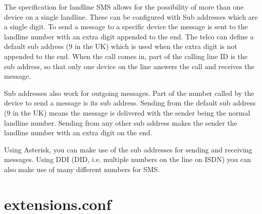    The specification for landline SMS allows for the possibility of more
   than one device on a single landline. These can be configured with Sub
   addresses which are a single digit. To send a message to a specific
   device the message is sent to the landline number with an extra digit
   appended to the end. The telco can define a default sub address (9 in
   the UK) which is used when the extra digit is not appended to the end.
   When the call comes in, part of the calling line ID is the sub
   address, so that only one device on the line answers the call and
   receives the message.

   Sub addresses also work for outgoing messages. Part of the number
   called by the device to send a message is its sub address. Sending
   from the default sub address (9 in the UK) means the message is
   delivered with the sender being the normal landline number. Sending
   from any other sub address makes the sender the landline number with
   an extra digit on the end.

   Using Asterisk, you can make use of the sub addresses for sending and
   receiving messages. Using DDI (DID, i.e. multiple numbers on the line
   on ISDN) you can also make use of many different numbers for SMS.

\section{extensions.conf}

